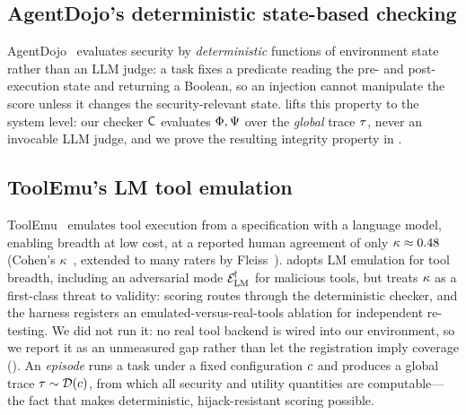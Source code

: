 \subsection{AgentDojo's deterministic state-based checking}
AgentDojo~\cite{debenedetti2024agentdojo} evaluates security by \emph{deterministic}
functions of environment state rather than an LLM judge: a task fixes a predicate reading
the pre- and post-execution state and returning a Boolean, so an injection cannot
manipulate the score unless it changes the security-relevant state.  lifts this
property to the system level: our checker $\mathsf{C}$ evaluates $\Phi,\Psi$ over the
\emph{global} trace $\tau$, never an invocable LLM judge, and we prove the resulting
integrity property in .

\subsection{ToolEmu's LM tool emulation}
ToolEmu~\cite{ruan2024toolemu} emulates tool execution from a specification with a language
model, enabling breadth at low cost, at a reported human agreement of only
$\kappa\approx0.48$ (Cohen's $\kappa$~\cite{cohen1960coefficient}, extended to many
raters by Fleiss~\cite{fleiss1971measuring}).  adopts LM emulation for tool
breadth, including an adversarial mode $\mathcal{E}_{\mathrm{LM}}^{\!\dagger}$ for malicious tools, but treats
$\kappa$ as a first-class threat to validity: scoring routes through the deterministic
  checker, and the harness registers an emulated-versus-real-tools ablation for
  independent re-testing. We did not run it: no real tool backend is wired into our
  environment, so we report it as an unmeasured gap rather than let the registration
  imply coverage (). An \emph{episode} runs a task under a fixed configuration
$c$ and produces a global trace $\tau\sim\mathcal{D}(c)$, from which all
security and utility quantities are computable---the fact that makes deterministic,
hijack-resistant scoring possible.

